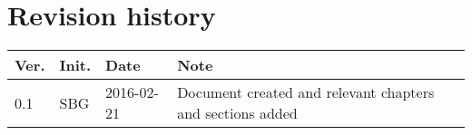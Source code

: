 \label{chp_revisionHistory}
\chapter*{Revision history}

\begin{tabular}{b{1cm} b{1cm} b{2cm} b{8cm}}
	\textbf{Ver.} & \textbf{Init.} & \textbf{Date} & \textbf{Note}\\
	\hline
    0.1 & SBG & 2016-02-21 & Document created and relevant chapters and sections added \\
\end{tabular}

